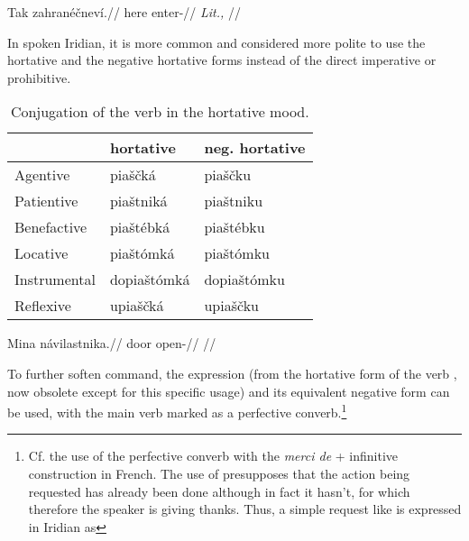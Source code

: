\pex
\begingl
    \gla Tak zahranéčneví.//
    \glb here enter-//
    \glft {} \textit{Lit.,} //
\endgl
\xe

In spoken Iridian, it is more common and considered more polite to use the
hortative and the negative hortative forms instead of the direct imperative
or prohibitive.

\begin{table}[ht!]
    \footnotesize\sffamily
		\caption{Conjugation of the verb  in the hortative mood.}
		\label{tbl:hortative}
		\medskip
    \begin{tabu}to 0.7
         \toprule

         &{\sc hortative}&{\sc neg. hortative}  \\
         \midrule
         Agentive &
         {piaščká} &
         {piaščku}\\

         Patientive &
         {piaštniká} &
         {piaštniku}\\

         Benefactive &
         {piaštébká} &
         {piaštébku}\\

         Locative &
         {piaštómká} &
         {piaštómku}\\

         Instrumental &
         {dopiaštómká} &
         {dopiaštómku}\\

         Reflexive &
         {upiaščká} &
         {upiaščku}\\

         \bottomrule
    \end{tabu}

\end{table}

\pex
\begingl
\gla Mina návilastnika.//
\glb door open-//
\glft {}//
\endgl
\xe

To further soften command, the expression  (from the hortative
form of the verb , now obsolete except for this
specific usage) and its equivalent negative form  can be used,
with the main verb marked as a perfective converb.\footnote{Cf.
the use of the perfective converb with the \textit{merci de} + infinitive
construction in French. The use of  presupposes
that the action being requested has already been done although in fact it
hasn't, for which therefore the speaker is giving thanks. Thus, a simple request
like  is expressed in Iridian as }

